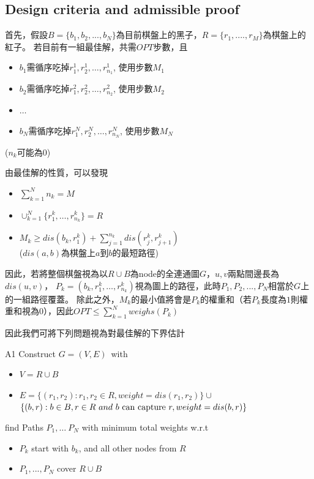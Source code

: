 \documentclass[a4paper, 12pt]{article}  %
\begin{document}
\subsection{Design criteria and admissible proof}
首先，假設$B=\{b_1,b_2,...,b_N\}$為目前棋盤上的黑子，$R=\{r_1,....,r_M\}$為棋盤上的紅子。
若目前有一組最佳解，共需$OPT$步數，且
\begin{itemize}
    \item $b_1$需循序吃掉$r^1_{1},r^1_2,\ldots,r^1_{n_1}$, 使用步數$M_1$
    \item $b_2$需循序吃掉$r^2_{1},r^2_2,\ldots,r^2_{n_2}$,  使用步數$M_2$
    \item $\ldots$
    \item $b_N$需循序吃掉$r^N_{1},r^N_2,\ldots,r^N_{n_N}$, 使用步數$M_N$
\end{itemize}
($n_k$可能為$0$)

由最佳解的性質，可以發現
\begin{itemize}
    \item $\sum_{k=1}^N n_k=M$
    \item $\cup_{k=1}^N \{r^k_1,\ldots,r^k_{n_k}\}=R$
    \item $M_k \ge dis(b_k, r^k_1) + \sum_{j=1}^{n_k} dis(r^k_{j}, r^k_{j+1})$\\
    ($dis(a,b)$為棋盤上$a$到$b$的最短路徑)
\end{itemize}

因此，若將整個棋盤視為以$R\cup B$為node的全連通圖$G$，$u,v$兩點間邊長為$dis(u,v)$，
$P_k=(b_k,r_1^k,\ldots,r_{n_k}^k)$視為圖上的路徑，此時$P_1,P_2,...,P_N$相當於$G$上的一組路徑覆蓋。
除此之外，$M_k$的最小值將會是$P_k$的權重和（若$P_k$長度為$1$則權重和視為$0$），因此$OPT\le \sum_{k=1}^N weighs(P_k)$

\newpage

因此我們可將下列問題視為對最佳解的下界估計
\begin{problem}{}{A1}
    Construct $G=(V,E)$\ with
    \begin{itemize}
        \item $V=R\cup B$
        \item $E= \{ (r_1,r_2):r_1,r_2\in  R,weight=dis(r_1,r_2) \} \cup$
        $\{(b,r):b\in B, r\in R\ and\ b\ {\rm can\ capture}\ r,weight=dis(b,r)\}$
    \end{itemize}
    find Paths $P_1,\ldots\ P_N$ with minimum total weights w.r.t
    \begin{itemize}
        \item $P_k$ start with $b_k$, and all other nodes from $R$
        \item $P_1,...,P_N$ cover $R\cup B$
    \end{itemize}

\end{problem}
\end{document}
